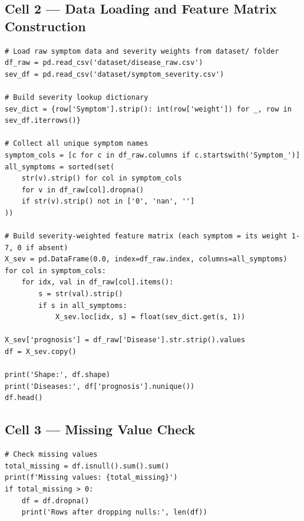 \documentclass[12pt,a4paper]{article}
\begin{document}
\subsection{Cell 2 --- Data Loading and Feature Matrix Construction}

\begin{lstlisting}[caption=Cell 2: Data Loading and Severity-Weighted Feature Construction]
# Load raw symptom data and severity weights from dataset/ folder
df_raw = pd.read_csv('dataset/disease_raw.csv')
sev_df = pd.read_csv('dataset/symptom_severity.csv')

# Build severity lookup dictionary
sev_dict = {row['Symptom'].strip(): int(row['weight']) for _, row in sev_df.iterrows()}

# Collect all unique symptom names
symptom_cols = [c for c in df_raw.columns if c.startswith('Symptom_')]
all_symptoms = sorted(set(
    str(v).strip() for col in symptom_cols
    for v in df_raw[col].dropna()
    if str(v).strip() not in ['0', 'nan', '']
))

# Build severity-weighted feature matrix (each symptom = its weight 1-7, 0 if absent)
X_sev = pd.DataFrame(0.0, index=df_raw.index, columns=all_symptoms)
for col in symptom_cols:
    for idx, val in df_raw[col].items():
        s = str(val).strip()
        if s in all_symptoms:
            X_sev.loc[idx, s] = float(sev_dict.get(s, 1))

X_sev['prognosis'] = df_raw['Disease'].str.strip().values
df = X_sev.copy()

print('Shape:', df.shape)
print('Diseases:', df['prognosis'].nunique())
df.head()
\end{lstlisting}

\subsection{Cell 3 --- Missing Value Check}

\begin{lstlisting}[caption=Cell 3: Missing Value Check]
# Check missing values
total_missing = df.isnull().sum().sum()
print(f'Missing values: {total_missing}')
if total_missing > 0:
    df = df.dropna()
    print('Rows after dropping nulls:', len(df))
\end{lstlisting}

\end{document}
